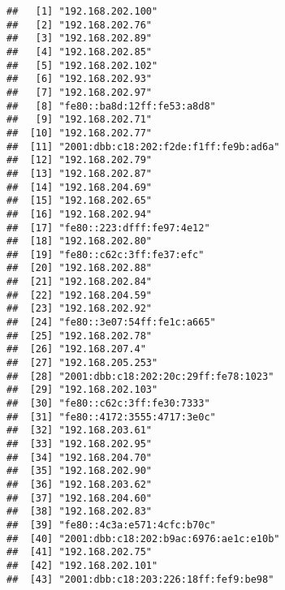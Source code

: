 \documentclass[
]{article}
\newenvironment{Shaded}{\begin{snugshade}}{\end{snugshade}}
\newcommand{\AttributeTok}[1]{\textcolor[rgb]{0.77,0.63,0.00}{#1}}
\newcommand{\FunctionTok}[1]{\textcolor[rgb]{0.00,0.00,0.00}{#1}}
\newcommand{\NormalTok}[1]{#1}
\newcommand{\OtherTok}[1]{\textcolor[rgb]{0.56,0.35,0.01}{#1}}
\newcommand{\SpecialCharTok}[1]{\textcolor[rgb]{0.00,0.00,0.00}{#1}}
\newcommand{\StringTok}[1]{\textcolor[rgb]{0.31,0.60,0.02}{#1}}
\begin{document}
\begin{Shaded}
\end{Shaded}

\begin{verbatim}
##   [1] "192.168.202.100"                     
##   [2] "192.168.202.76"                      
##   [3] "192.168.202.89"                      
##   [4] "192.168.202.85"                      
##   [5] "192.168.202.102"                     
##   [6] "192.168.202.93"                      
##   [7] "192.168.202.97"                      
##   [8] "fe80::ba8d:12ff:fe53:a8d8"           
##   [9] "192.168.202.71"                      
##  [10] "192.168.202.77"                      
##  [11] "2001:dbb:c18:202:f2de:f1ff:fe9b:ad6a"
##  [12] "192.168.202.79"                      
##  [13] "192.168.202.87"                      
##  [14] "192.168.204.69"                      
##  [15] "192.168.202.65"                      
##  [16] "192.168.202.94"                      
##  [17] "fe80::223:dfff:fe97:4e12"            
##  [18] "192.168.202.80"                      
##  [19] "fe80::c62c:3ff:fe37:efc"             
##  [20] "192.168.202.88"                      
##  [21] "192.168.202.84"                      
##  [22] "192.168.204.59"                      
##  [23] "192.168.202.92"                      
##  [24] "fe80::3e07:54ff:fe1c:a665"           
##  [25] "192.168.202.78"                      
##  [26] "192.168.207.4"                       
##  [27] "192.168.205.253"                     
##  [28] "2001:dbb:c18:202:20c:29ff:fe78:1023" 
##  [29] "192.168.202.103"                     
##  [30] "fe80::c62c:3ff:fe30:7333"            
##  [31] "fe80::4172:3555:4717:3e0c"           
##  [32] "192.168.203.61"                      
##  [33] "192.168.202.95"                      
##  [34] "192.168.204.70"                      
##  [35] "192.168.202.90"                      
##  [36] "192.168.203.62"                      
##  [37] "192.168.204.60"                      
##  [38] "192.168.202.83"                      
##  [39] "fe80::4c3a:e571:4cfc:b70c"           
##  [40] "2001:dbb:c18:202:b9ac:6976:ae1c:e10b"
##  [41] "192.168.202.75"                      
##  [42] "192.168.202.101"                     
##  [43] "2001:dbb:c18:203:226:18ff:fef9:be98" 

\end{verbatim}
\end{document}
